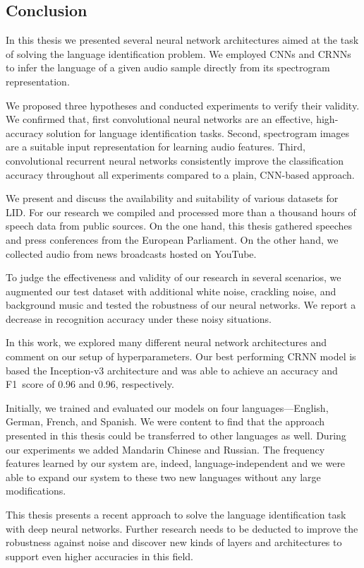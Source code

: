 \subsection{Conclusion}
In this thesis we presented several neural network architectures aimed at the task of solving the language identification problem. We employed CNNs and CRNNs to infer the language of a given audio sample directly from its spectrogram representation. 

We proposed three hypotheses and conducted experiments to verify their validity. We confirmed that, first convolutional neural networks are an effective, high-accuracy solution for language identification tasks. Second, spectrogram images are a suitable input representation for learning audio features. Third, convolutional recurrent neural networks consistently improve the classification accuracy throughout all experiments compared to a plain, CNN-based approach.

We present and discuss the availability and suitability of various datasets for LID. For our research we compiled and processed more than a thousand hours of speech data from public sources. On the one hand, this thesis gathered speeches and press conferences from the European Parliament. On the other hand, we collected audio from news broadcasts hosted on YouTube.

To judge the effectiveness and validity of our research in several scenarios, we augmented our test dataset with additional white noise, crackling noise, and background music and tested the robustness of our neural networks. We report a decrease in recognition accuracy under these noisy situations.

In this work, we explored many different neural network architectures and comment on our setup of hyperparameters. Our best performing CRNN model is based the Inception-v3 architecture and was able to achieve an accuracy and F1~score of \num{0.96} and \num{0.96}, respectively.

Initially, we trained and evaluated our models on four languages---English, German, French, and Spanish. We were content to find that the approach presented in this thesis could be transferred to other languages as well. During our experiments we added Mandarin Chinese and Russian. The frequency features learned by our system are, indeed, language-independent and we were able to expand our system to these two new languages without any large modifications.

This thesis presents a recent approach to solve the language identification task with deep neural networks. Further research needs to be deducted to improve the robustness against noise and discover new kinds of layers and architectures to support even higher accuracies in this field. 
